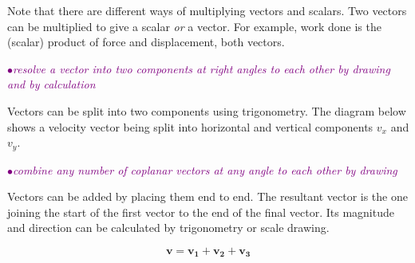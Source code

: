 \documentclass[a4paper,11pt,twoside]{memoir}
\newcounter{spec}[chapter]
\newcommand{\spec}[1]{\Needspace{5\baselineskip}\textcolor{purple}{$\bullet$\hspace{0.5cm}\textit{#1}}}
\begin{document}
Note that there are different ways of multiplying vectors and scalars. Two vectors can be multiplied to give a scalar \emph{or} a vector. For example, work done is the (scalar) product of force and displacement, both vectors.

\spec{resolve a vector into two components at right angles to each other by drawing and by calculation}

Vectors can be split into two components using trigonometry. The diagram below shows a velocity vector being split into horizontal and vertical components $v_x$ and $v_y$.

\begin{figure}[h]
\begin{center}
\end{center}
\end{figure}

\spec{combine any number of coplanar vectors at any angle to each other by drawing}

Vectors can be added by placing them end to end. The resultant vector is the one joining the start of the first vector to the end of the final vector. Its magnitude and direction can be calculated by trigonometry or scale drawing.

\begin{figure}[h]
	\begin{center}
	$$\mathbf{v} = \mathbf{v_1}+\mathbf{v_2}+\mathbf{v_3}$$
	\end{center}
\end{figure}
\end{document}
